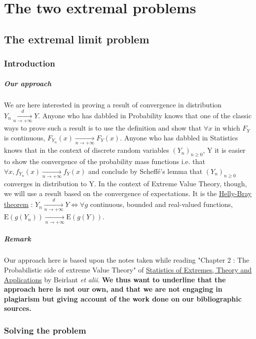 \chapter{The two extremal problems}
 \section{The extremal limit problem}
 \subsection{Introduction}
\paragraph{Our approach} We are here interested in proving a result of convergence in distribution $Y_n \xrightarrow[n \rightarrow + \infty]{d} Y$. Anyone who has dabbled in Probability knows that one of the classic ways to prove such a result is to use the definition and show that $\forall x$ in which $F_Y$ is continuous, $F_{Y_n}(x) \xrightarrow[n \rightarrow + \infty]{} F_Y(x)$. Anyone who has dabbled in Statistics knows that in the context of discrete random variables $(Y_n)_{n \ge 0}$, Y it is easier to show the convergence of the probability mass functions i.e. that $\forall x, f_{Y_n}(x) \xrightarrow[n \rightarrow + \infty]{} f_Y(x)$ and conclude by Scheffé's lemma that $(Y_n)_{n \ge 0}$ converges in distribution to Y. In the context of Extreme Value Theory, though, we will use a result based on the convergence of expectations. It is the \underline{Helly-Bray theorem} : \newline $Y_n \xrightarrow[n \rightarrow + \infty]{d} Y \iff \forall g$ continuous, bounded and real-valued functions, $\mathrm{E}(g(Y_n)) \xrightarrow[n \rightarrow + \infty]{} \mathrm{E}(g(Y))$.
\paragraph{Remark} Our approach here is based upon the notes taken while reading "Chapter 2 : The Probabilistic side of extreme Value Theory" of \underline{Statistics of Extremes, Theory and Applications} by Beirlant \textit{et alii}. \textbf{We thus want to underline that the approach here is not our own, and that we are not engaging in plagiarism but giving account of the work done on our bibliographic sources.} 
\subsection{Solving the problem}

